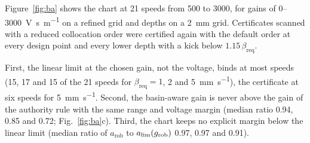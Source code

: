 Figure~\ref{fig:ba} shows the chart at 21 speeds from 500 to \SI{3000}{\rpm}, for gains of 0--\SI{3000}{\volt\second\per\metre} on a refined grid and depths on a \SI{2}{\milli\metre} grid. Certificates scanned with a reduced collocation order were certified again with the default order at every design point and every lower depth with a kick below $1.15\,\beta_{\mathrm{req}}$.

First, the linear limit at the chosen gain, not the voltage, binds at most speeds (15, 17 and 15 of the 21 speeds for $\beta_{\mathrm{req}}=1$, 2 and \SI{5}{\milli\metre\per\second}), the certificate at six speeds for \SI{5}{\milli\metre\per\second}. Second, the basin-aware gain is never above the gain of the authority rule with the same range and voltage margin (median ratio 0.94, 0.85 and 0.72; Fig.~\ref{fig:ba}c). Third, the chart keeps no explicit margin below the linear limit (median ratio of $a_{\mathrm{rob}}$ to $a_{\lim}(g_{\mathrm{rob}})$ 0.97, 0.97 and 0.91).

